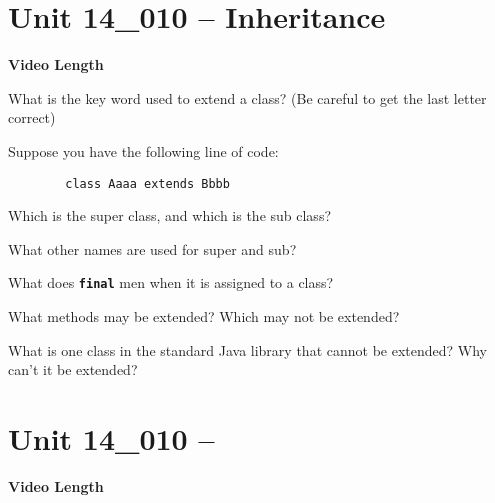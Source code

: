 \documentclass[letterpaper,12pt]{exam}
\newcommand{\unit}{Unit 14}
\begin{document}
\section*{\unit\_010 -- Inheritance} 
\par{\selectfont\textbf{Video Length }}
\begin{questions}

\begin{samepage}
    \question What is the key word used to extend a class?  (Be careful to get the last letter correct)
    \vspace{5mm}
\end{samepage}

\begin{samepage}
    \question Suppose you have the following line of code:
    \begin{verbatim}
        class Aaaa extends Bbbb
    \end{verbatim}
        Which is the super class, and which is the sub class?
    \vspace{5mm}
\end{samepage}
\begin{samepage}
    \question What other names are used for super and sub?
    \vspace{5mm}
\end{samepage}

\begin{samepage}
    \question What does \texttt{\textbf{final}} men when it is assigned to a class?
    \vspace{5mm}
\end{samepage}

\begin{samepage}
    \question What methods may be extended?  Which may not be extended?
    \vspace{5mm}
\end{samepage}

\begin{samepage}
    \question What is one class in the standard Java library that cannot be extended?  Why can't it be extended?
    \vspace{5mm}
\end{samepage}


\section*{\unit\_010 -- } 
\par{\selectfont\textbf{Video Length }}


\end{questions}
\end{document}
